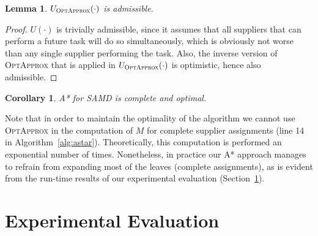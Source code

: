 \documentclass[letterpaper]{article} %
\newtheorem{corollary}{Corollary}
\newtheorem{lemma}{Lemma}
\newcommand{\samd}{\ac{SAMD}\xspace}
\newcommand{\astar}{\textsc{A*}\xspace}
\newcommand{\optapprox}{\textsc{OptApprox}\xspace}
\begin{document}
\begin{lemma}
$U_{\optapprox}(\cdot)$ is admissible.
\label{lem:admissible}
\end{lemma}

\begin{proof}
$U(\cdot)$ is trivially admissible, since it assumes that all suppliers that can perform a future task will do so simultaneously, which is obviously not worse than any single supplier performing the task. Also, the inverse version of \optapprox that is applied in $U_{\optapprox}(\cdot)$ is optimistic, hence also admissible.
\end{proof}

\begin{corollary}
\astar for \samd is complete and optimal.
\end{corollary}

Note that in order to maintain the optimality of the algorithm we cannot use \optapprox in the computation of $M$ for complete supplier assignments (line 14 in Algorithm~\ref{alg:astar}). Theoretically, this computation is performed an exponential number of times. Nonetheless, in practice our \astar approach manages to refrain from expanding most of the leaves (complete assignments), as is evident from the run-time results of our experimental evaluation (Section~\ref{sec:exp}).




\section{Experimental Evaluation}
\label{sec:exp}
\end{document}
